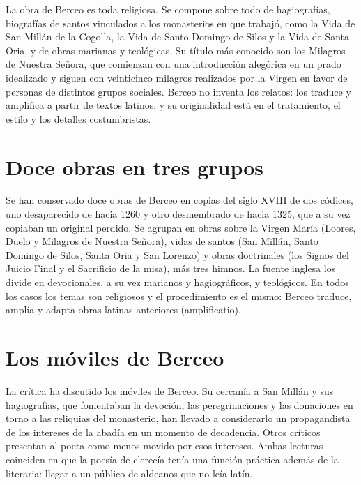 \documentclass{book}
\begin{document}
La obra de Berceo es toda religiosa. Se compone sobre todo de hagiografías, biografías de santos vinculados a los monasterios en que trabajó, como la Vida de San Millán de la Cogolla, la Vida de Santo Domingo de Silos y la Vida de Santa Oria, y de obras marianas y teológicas. Su título más conocido son los Milagros de Nuestra Señora, que comienzan con una introducción alegórica en un prado idealizado y siguen con veinticinco milagros realizados por la Virgen en favor de personas de distintos grupos sociales. Berceo no inventa los relatos: los traduce y amplifica a partir de textos latinos, y su originalidad está en el tratamiento, el estilo y los detalles costumbristas.


\section{Doce obras en tres grupos}

Se han conservado doce obras de Berceo en copias del siglo XVIII de dos códices, uno desaparecido de hacia 1260 y otro desmembrado de hacia 1325, que a su vez copiaban un original perdido. Se agrupan en obras sobre la Virgen María (Loores, Duelo y Milagros de Nuestra Señora), vidas de santos (San Millán, Santo Domingo de Silos, Santa Oria y San Lorenzo) y obras doctrinales (los Signos del Juicio Final y el Sacrificio de la misa), más tres himnos. La fuente inglesa los divide en devocionales, a su vez marianos y hagiográficos, y teológicos. En todos los casos los temas son religiosos y el procedimiento es el mismo: Berceo traduce, amplía y adapta obras latinas anteriores (amplificatio).


\section{Los móviles de Berceo}

La crítica ha discutido los móviles de Berceo. Su cercanía a San Millán y sus hagiografías, que fomentaban la devoción, las peregrinaciones y las donaciones en torno a las reliquias del monasterio, han llevado a considerarlo un propagandista de los intereses de la abadía en un momento de decadencia. Otros críticos presentan al poeta como menos movido por esos intereses. Ambas lecturas coinciden en que la poesía de clerecía tenía una función práctica además de la literaria: llegar a un público de aldeanos que no leía latín.
\end{document}
